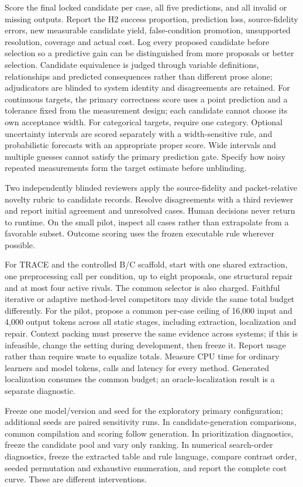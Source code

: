 \documentclass[11pt,a4paper]{article}
\begin{document}
Score the final locked candidate per case, all five predictions, and all
invalid or missing outputs. Report the H2 success proportion, prediction
loss, source-fidelity errors, new measurable candidate yield,
false-condition promotion, unsupported resolution, coverage and actual
cost. Log every proposed candidate before selection so a predictive gain
can be distinguished from more proposals or better selection. Candidate
equivalence is judged through variable definitions, relationships and
predicted consequences rather than different prose alone; adjudicators
are blinded to system identity and disagreements are retained. For
continuous targets, the primary correctness score uses a point
prediction and a tolerance fixed from the measurement design; each
candidate cannot choose its own acceptance width. For categorical
targets, require one category. Optional uncertainty intervals are scored
separately with a width-sensitive rule, and probabilistic forecasts with
an appropriate proper score. Wide intervals and multiple guesses cannot
satisfy the primary prediction gate. Specify how noisy repeated
measurements form the target estimate before unblinding.

Two independently blinded reviewers apply the source-fidelity and
packet-relative novelty rubric to candidate records. Resolve
disagreements with a third reviewer and report initial agreement and
unresolved cases. Human decisions never return to runtime. On the small
pilot, inspect all cases rather than extrapolate from a favorable
subset. Outcome scoring uses the frozen executable rule wherever
possible.

For TRACE and the controlled B/C scaffold, start with one shared
extraction, one preprocessing call per condition, up to eight proposals,
one structural repair and at most four active rivals. The common
selector is also charged. Faithful iterative or adaptive method-level
competitors may divide the same total budget differently. For the pilot,
propose a common per-case ceiling of 16,000 input and 4,000 output
tokens across all static stages, including extraction, localization and
repair. Context packing must preserve the same evidence across systems;
if this is infeasible, change the setting during development, then
freeze it. Report usage rather than require waste to equalize totals.
Measure CPU time for ordinary learners and model tokens, calls and
latency for every method. Generated localization consumes the common
budget; an oracle-localization result is a separate diagnostic.

Freeze one model/version and seed for the exploratory primary
configuration; additional seeds are paired sensitivity runs. In
candidate-generation comparisons, common compilation and scoring follow
generation. In prioritization diagnostics, freeze the candidate pool and
vary only ranking. In numerical search-order diagnostics, freeze the
extracted table and rule language, compare contrast order, seeded
permutation and exhaustive enumeration, and report the complete cost
curve. These are different interventions.
\end{document}

